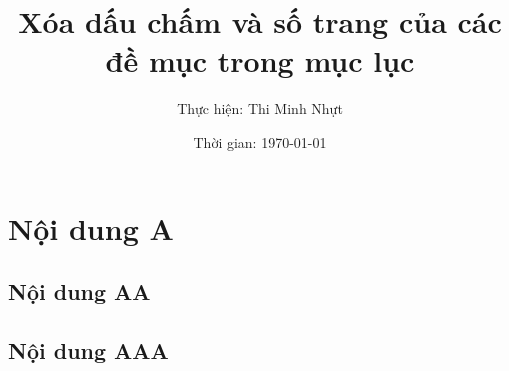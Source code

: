 \documentclass[10pt,a4paper]{article}
\title{Xóa dấu chấm và số trang của các đề mục trong mục lục}
\author{Thực hiện: Thi Minh Nhựt}
\author{Thời gian: \today}
\begin{document}
\maketitle
    
\tableofcontents
\newpage


\section{Nội dung A}
\subsection{Nội dung AA}
\subsection{Nội dung AAA}
\end{document}
